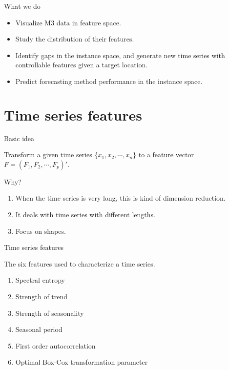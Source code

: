 \documentclass[12pt,ignorenonframetext,compress]{beamer}
\providecommand{\tightlist}{%
\setlength{\itemsep}{0pt}\setlength{\parskip}{0pt}}
\begin{document}
\begin{frame}{What we do}

\begin{itemize}
\tightlist
\item
  Visualize M3 data in feature space.
\item
  Study the distribution of their features.
\item
  Identify gaps in the instance space, and generate new time series with
  controllable features given a target location.
\item
  Predict forecasting method performance in the instance space.
\end{itemize}

\end{frame}

\section{Time series features}\label{time-series-features}

\begin{frame}{Basic idea}

Transform a given time series \(\{x_1, x_2, \cdots, x_n\}\) to a feature
vector \(F = (F_1, F_2, \cdots, F_p)'\).

\begin{block}{Why?}

\begin{enumerate}
\def\labelenumi{\arabic{enumi}.}
\tightlist
\item
  When the time series is very long, this is kind of dimension
  reduction.
\item
  It deals with time series with different lengths.
\item
  Focus on shapes.
\end{enumerate}

\end{block}

\end{frame}

\begin{frame}{Time series features}


\begin{alertblock}{The six features used to characterize a time series.}
\begin{enumerate}
\item Spectral entropy
\item Strength of trend
\item Strength of seasonality
\item Seasonal period
\item First order autocorrelation
\item Optimal Box-Cox transformation parameter
\end{enumerate} 
\end{alertblock}

\end{frame}
\end{document}
